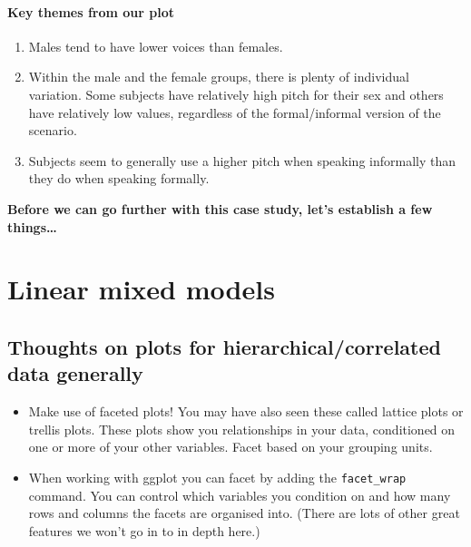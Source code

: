 \documentclass[
  openany]{book}
\providecommand{\tightlist}{%
  \setlength{\itemsep}{0pt}\setlength{\parskip}{0pt}}
\begin{document}
\hypertarget{key-themes-from-our-plot}{%
\paragraph{Key themes from our plot}\label{key-themes-from-our-plot}}

\begin{enumerate}
\def\labelenumi{\arabic{enumi}.}
\tightlist
\item
  Males tend to have lower voices than females.
\item
  Within the male and the female groups, there is plenty of individual variation. Some subjects have relatively high pitch for their sex and others have relatively low values, regardless of the formal/informal version of the scenario.
\item
  Subjects seem to generally use a higher pitch when speaking informally than they do when speaking formally.
\end{enumerate}

\textbf{Before we can go further with this case study, let's establish a few things\ldots{}}

\hypertarget{linear-mixed-models}{%
\section{Linear mixed models}\label{linear-mixed-models}}

\hypertarget{thoughts-on-plots-for-hierarchicalcorrelated-data-generally}{%
\subsection{Thoughts on plots for hierarchical/correlated data generally}\label{thoughts-on-plots-for-hierarchicalcorrelated-data-generally}}

\begin{itemize}
\tightlist
\item
  Make use of faceted plots! You may have also seen these called lattice plots or trellis plots. These plots show you relationships in your data, conditioned on one or more of your other variables. Facet based on your grouping units.
\item
  When working with ggplot you can facet by adding the \texttt{facet\_wrap} command. You can control which variables you condition on and how many rows and columns the facets are organised into. (There are lots of other great features we won't go in to in depth here.)
\end{itemize}
\end{document}
